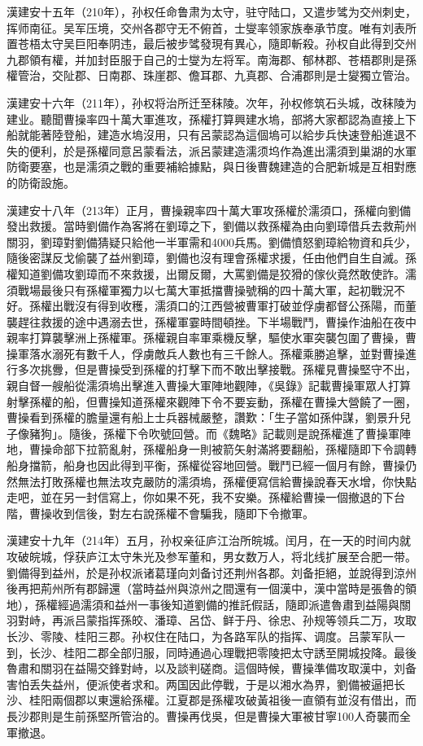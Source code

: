 漢建安十五年（210年），孙权任命鲁肃为太守，驻守陆口，又遣步骘为交州刺史，挥师南征。吴军压境，交州各郡守无不俯首，士燮率领家族奉承节度。唯有刘表所置苍梧太守吴巨阳奉阴违，最后被步骘發現有異心，隨即斬殺。孙权自此得到交州九郡領有權，并加封臣服于自己的士燮为左将军。南海郡、郁林郡、苍梧郡則是孫權管治，交阯郡、日南郡、珠崖郡、儋耳郡、九真郡、合浦郡則是士夑獨立管治。

漢建安十六年（211年），孙权将治所迁至秣陵。次年，孙权修筑石头城，改秣陵为建业。聽聞曹操率四十萬大軍進攻，孫權打算興建水塢，部將大家都認為直接上下船就能著陸登船，建造水塢沒用，只有呂蒙認為這個塢可以給步兵快速登船進退不失的便利，於是孫權同意呂蒙看法，派呂蒙建造濡须坞作為進出濡須到巢湖的水軍防衛要塞，也是濡須之戰的重要補給據點，與日後曹魏建造的合肥新城是互相對應的防衛設施。

漢建安十八年（213年）正月，曹操親率四十萬大軍攻孫權於濡須口，孫權向劉備發出救援。當時劉備作為客將在劉璋之下，劉備以救孫權為由向劉璋借兵去救荊州關羽，劉璋對劉備猜疑只給他一半軍需和4000兵馬。劉備憤怒劉璋給物資和兵少，隨後密謀反戈偷襲了益州劉璋，劉備也沒有理會孫權求援，任由他們自生自滅。孫權知道劉備攻劉璋而不來救援，出爾反爾，大罵劉備是狡猾的傢伙竟然敢使詐。濡須戰場最後只有孫權軍獨力以七萬大軍抵擋曹操號稱的四十萬大軍，起初戰況不好。孫權出戰沒有得到收穫，濡須口的江西營被曹軍打破並俘虜都督公孫陽，而董襲趕往救援的途中遇溺去世，孫權軍霎時間頓挫。下半場戰鬥，曹操作油船在夜中親率打算襲擊洲上孫權軍。孫權親自率軍乘機反擊，驅使水軍突襲包圍了曹操，曹操軍落水溺死有數千人，俘虜敵兵人數也有三千餘人。孫權乘勝追擊，並對曹操進行多次挑釁，但是曹操受到孫權的打擊下而不敢出擊接戰。孫權見曹操堅守不出，親自督一艘船從濡須塢出擊進入曹操大軍陣地觀陣，《吳錄》記載曹操軍眾人打算射擊孫權的船，但曹操知道孫權來觀陣下令不要妄動，孫權在曹操大營饒了一圈，曹操看到孫權的膽量還有船上士兵器械嚴整，讚歎：「生子當如孫仲謀，劉景升兒子像豬狗」。隨後，孫權下令吹號回營。而《魏略》記載则是說孫權進了曹操軍陣地，曹操命部下拉箭亂射，孫權船身一則被箭矢射滿將要翻船，孫權隨即下令調轉船身擋箭，船身也因此得到平衡，孫權從容地回營。戰鬥已經一個月有餘，曹操仍然無法打敗孫權也無法攻克嚴防的濡須塢，孫權便寫信給曹操說春天水增，你快點走吧，並在另一封信寫上，你如果不死，我不安樂。孫權給曹操一個撤退的下台階，曹操收到信後，對左右說孫權不會騙我，隨即下令撤軍。

漢建安十九年（214年）五月，孙权亲征庐江治所皖城。闰月，在一天的时间内就攻破皖城，俘获庐江太守朱光及参军董和，男女数万人，将北线扩展至合肥一带。劉備得到益州，於是孙权派诸葛瑾向刘备讨还荆州各郡。刘备拒絕，並說得到涼州後再把荊州所有郡歸還（當時益州與涼州之間還有一個漢中，漢中當時是張魯的領地），孫權經過濡須和益州一事後知道劉備的推託假話，隨即派遣魯肅到益陽與關羽對峙，再派吕蒙指挥孫皎、潘璋、呂岱、鲜于丹、徐忠、孙规等领兵二万，攻取长沙、零陵、桂阳三郡。孙权住在陆口，为各路军队的指挥、调度。吕蒙军队一到，长沙、桂阳二郡全部归服，同時通過心理戰把零陵把太守誘至開城投降。最後魯肅和關羽在益陽交鋒對峙，以及談判磋商。這個時候，曹操準備攻取漢中，刘备害怕丢失益州，便派使者求和。两国因此停戰，于是以湘水為界，劉備被逼把长沙、桂阳兩個郡以東還給孫權。江夏郡是孫權攻破黃祖後一直領有並沒有借出，而長沙郡則是生前孫堅所管治的。曹操再伐吳，但是曹操大軍被甘寧100人奇襲而全軍撤退。


